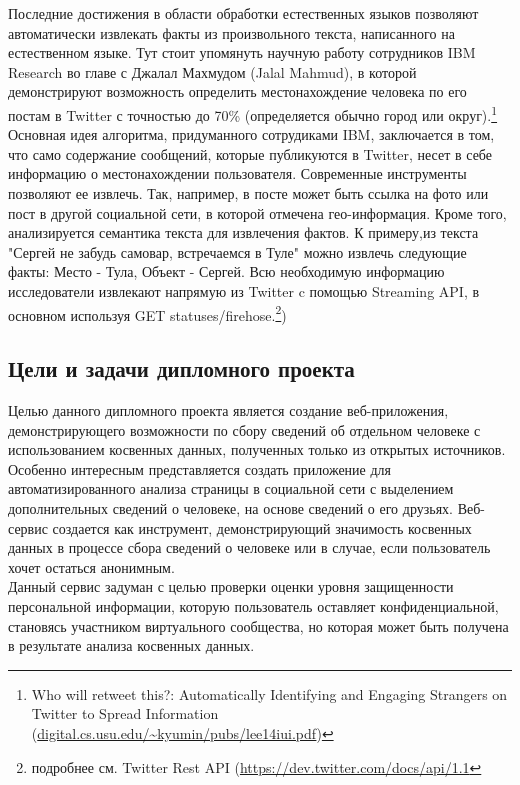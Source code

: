 Последние достижения в области обработки естественных языков позволяют автоматически извлекать факты из произвольного текста, написанного на естественном языке. Тут стоит упомянуть научную работу сотрудников IBM Research во главе с Джалал Махмудом (Jalal Mahmud), в которой демонстрируют возможность определить местонахождение человека по его постам в Twitter с точностью до 70\% (определяется обычно город или округ).\footnote{Who will retweet this?: Automatically Identifying and Engaging Strangers on Twitter to Spread Information (\url{digital.cs.usu.edu/~kyumin/pubs/lee14iui.pdf‎})}
 Основная идея алгоритма, придуманного сотрудиками IBM, заключается в том, что само содержание сообщений, которые публикуются в Twitter, несет в себе информацию о местонахождении пользователя. Современные  инструменты  позволяют ее извлечь. Так, например, в посте может быть ссылка на фото или пост в другой социальной сети, в которой отмечена гео-информация. Кроме того, анализируется семантика текста для извлечения фактов. К примеру,из текста "Сергей не забудь самовар, встречаемся в Туле" можно извлечь следующие факты: Место - Тула, Объект - Сергей. Всю необходимую информацию исследователи извлекают напрямую из Twitter c помощью Streaming API, в основном используя GET statuses/firehose.\footnote{подробнее см. Twitter Rest API (\url{https://dev.twitter.com/docs/api/1.1}})\\ 


\subsection{Цели и задачи дипломного проекта}

Целью данного дипломного проекта является создание веб-приложения, демонстрирующего  возможности по сбору сведений об отдельном человеке с использованием косвенных данных, полученных только из открытых источников. Особенно интересным представляется создать приложение для автоматизированного анализа страницы в социальной сети с выделением дополнительных сведений о человеке, на основе сведений о его друзьях. Веб-сервис создается как инструмент, демонстрирующий значимость косвенных данных в процессе сбора сведений о человеке или в случае, если пользователь хочет остаться анонимным.\\

Данный сервис задуман с целью проверки оценки уровня защищенности персональной информации, которую пользователь оставляет конфиденциальной, становясь участником виртуального сообщества, но которая может быть получена в результате анализа косвенных данных.
\\

